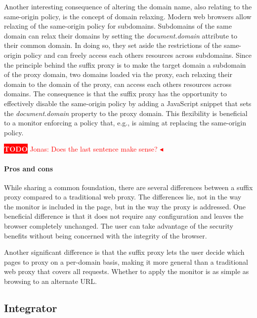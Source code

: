 \documentclass{llncs}
\newcommand{\todo}[1]{\colorbox{red}{\textcolor{white}{\sffamily\bfseries\scriptsize TODO}} \textcolor{red}{#1} \textcolor{red}{$\blacktriangleleft$}}
\begin{document}
Another interesting consequence of altering the domain name, also relating to 
the same-origin policy, is the concept of domain relaxing. Modern web browsers 
allow relaxing of the same-origin policy for subdomains. Subdomains of the same 
domain can relax their domains by setting the \emph{document.domain} attribute
to their common domain. In doing so, they set aside the restrictions of the 
same-origin policy and can freely access each others resources across subdomains. 
Since the principle behind the suffix proxy is to make the target domain a subdomain of the proxy domain, two 
domains loaded via the proxy, each relaxing their domain to the domain of the 
proxy, can access each others resources across domains.
The consequence is that the suffix proxy has the opportunity to effectively disable the same-origin 
policy by adding a JavaScript snippet that sets the \emph{document.domain} property
to the proxy domain. This flexibility is beneficial to a monitor enforcing a policy that, e.g., is aiming 
at replacing the same-origin policy.

\todo{Jonas: Does the last sentence make sense?}



\paragraph{Pros and cons}

While sharing a common foundation, there are several differences between a 
suffix proxy compared to a traditional web proxy. The differences lie, not in 
the way the monitor is included in the page, but in the way the proxy is 
addressed. One beneficial difference is that it does not require any 
configuration and leaves the browser completely unchanged. The user can take
advantage of the security benefits without being concerned with the integrity 
of the browser.

Another significant difference is that the suffix proxy lets the user decide which pages to proxy on a 
per-domain basis, making it more general than a traditional web proxy that covers 
all requests. %
Whether to apply the monitor is as simple as browsing to an alternate URL.


\subsection{Integrator}
\end{document}
